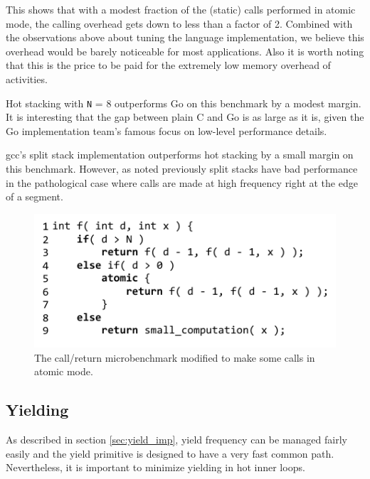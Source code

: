 \documentclass[acmsmall,anonymous,review]{acmart}\settopmatter{printfolios=true,printccs=false,printacmref=false}
\begin{document}

This shows that with a modest fraction of the (static) calls performed in atomic mode, the calling overhead gets down to less than a factor of 2.
Combined with the observations above about tuning the language implementation, we believe this overhead would be barely noticeable for most applications.
Also it is worth noting that this is the price to be paid for the extremely low memory overhead of activities.

Hot stacking with \texttt{N} = 8 outperforms Go on this benchmark by a modest margin.
It is interesting that the gap between plain C and Go is as large as it is, given the Go implementation team's famous focus on low-level performance details.

gcc's split stack implementation outperforms hot stacking by a small margin on this benchmark.
However, as noted previously split stacks have bad performance in the pathological case where calls are made at high frequency right at the edge of a segment.

\begin{figure}
\includegraphics{just_calling_n_benchmark}
\caption{The call/return microbenchmark modified to make some calls in atomic mode.}
\label{fig:micro_calling_n}
\end{figure}

\subsection{Yielding}

As described in section \ref{sec:yield_imp}, yield frequency can be managed fairly easily and the yield primitive is designed to have a very fast common path.
Nevertheless, it is important to minimize yielding in hot inner loops.
\end{document}
